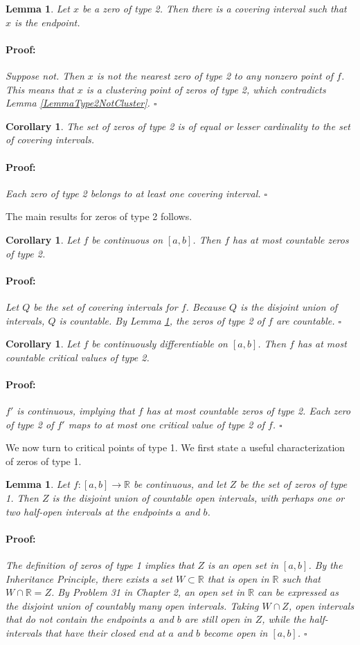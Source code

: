 \documentclass{article}
\newenvironment{proof}{\paragraph{Proof:}}{\hfill$\square$}
\newtheorem{lemma}[theorem]{Lemma}
\newtheorem{corollary}[theorem]{Corollary}
\newcommand{\R}{\mathbb{R}}
\begin{document}
\begin{lemma}
Let $x$ be a zero of type 2. Then there is a covering interval such that $x$ is the endpoint. 
\begin{proof}
Suppose not. Then $x$ is not the nearest zero of type 2 to any nonzero point of $f$. This means that $x$ is a clustering point of zeros of type 2, which contradicts Lemma \ref{LemmaType2NotCluster}.
\end{proof}
\end{lemma}

\begin{corollary}
\label{CorollaryZeroType2Cardinality}
The set of zeros of type 2 is of equal or lesser cardinality to the set of covering intervals.
\begin{proof}
Each zero of type 2 belongs to at least one covering interval.
\end{proof}
\end{corollary}

The main results for zeros of type 2 follows.

\begin{corollary}
Let $f$ be continuous on $[a, b]$. Then $f$ has at most countable zeros of type 2.
\begin{proof}
Let $Q$ be the set of covering intervals for $f$. Because $Q$ is the disjoint union of intervals, $Q$ is countable. By Lemma \ref{CorollaryZeroType2Cardinality}, the zeros of type 2 of $f$ are countable.
\end{proof}
\end{corollary}

\begin{corollary}
Let $f$ be continuously differentiable on $[a, b]$. Then $f$ has at most countable critical values of type 2.
\begin{proof}
$f'$ is continuous, implying that $f$ has at most countable zeros of type 2. Each zero of type 2 of $f'$ maps to at most one critical value of type 2 of $f$.
\end{proof}
\end{corollary}

We now turn to critical points of type 1. We first state a useful characterization of zeros of type 1.

\begin{lemma}
\label{LemmaZerosType1}
Let $f: [a, b] \rightarrow \R$ be continuous, and let $Z$ be the set of zeros of type 1. Then $Z$ is the  disjoint union of countable open intervals, with perhaps one or two half-open intervals at the endpoints $a$ and $b$.
\begin{proof}
The definition of zeros of type 1 implies that $Z$ is an open set in $[a, b]$. By the Inheritance Principle, there exists a set $W \subset \R$ that is open in $\R$ such that $W \cap \R = Z$. By Problem 31 in Chapter 2, an open set in $\R$ can be expressed as the disjoint union of countably many open intervals. Taking $W \cap Z$, open intervals that do not contain the endpoints $a$ and $b$ are still open in $Z$, while the half-intervals that have their closed end at $a$ and $b$ become open in $[a, b]$.
\end{proof}
\end{lemma}
\end{document}

